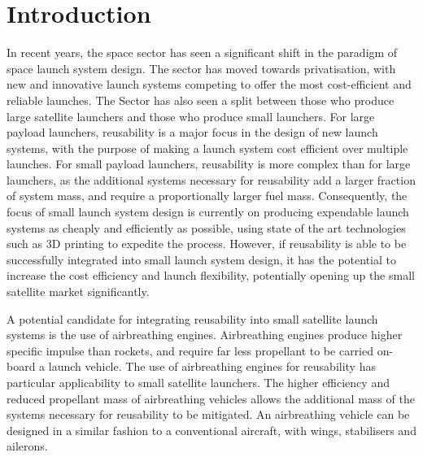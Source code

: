 
\cleardoublepage
\chapter{Introduction}

  	
  	
  	In recent years, the space sector has seen a significant shift in the paradigm of space launch system design. 
  	The sector has moved towards privatisation, with new and innovative launch systems competing to offer the most cost-efficient and reliable launches. 
  	The Sector has also seen a split between those who produce large satellite launchers and those who produce small launchers.
  	For large payload launchers, reusability is a major focus in the design of new launch systems, with the purpose of making a launch system cost efficient over multiple launches. 
  	For small payload launchers, reusability is more complex than for large launchers, as the additional systems necessary for reusability add a larger fraction of system mass, and require a proportionally larger fuel mass. 
  	Consequently, the focus of small launch system design is currently on producing expendable launch systems as cheaply and efficiently as possible, using state of the art technologies such as 3D printing to expedite the process.
  	However, if reusability is able to be successfully integrated into small launch system design, it has the potential to increase the cost efficiency and launch flexibility, potentially opening up the small satellite market significantly. 
  	
  	
  	
  	A potential candidate for integrating reusability into small satellite launch systems is the use of airbreathing engines.
Airbreathing engines produce higher specific impulse than rockets, and require far less propellant to be carried on-board a launch vehicle.  
 	The use of airbreathing engines for reusability has particular applicability to small satellite launchers. 	 
  	The higher efficiency and reduced propellant mass of airbreathing vehicles allows the additional mass of the systems necessary for reusability to be mitigated. An airbreathing vehicle can be designed in a similar fashion to a conventional aircraft, with wings, stabilisers and ailerons.
  	
